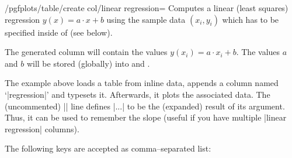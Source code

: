 \begin{stylekey}{/pgfplots/table/create col/linear regression=}%
	Computes a linear (least squares) regression $y(x) = a \cdot x + b$ using the sample data $(x_i,y_i)$ which has to be specified inside of  (see below).

	The generated column will contain the values $y(x_i) = a \cdot x_i + b$. The values $a$ and $b$ will be stored (globally) into \declareandlabel{\pgfplotstableregressiona} and \declareandlabel{\pgfplotstableregressionb}.

\begin{codeexample}[]
\loadedtbl

	{\loadedtbl}

\pgfplotstabletypeset\loadedtbl

\end{codeexample}

	\noindent The example above loads a table from inline data, appends a column named `|regression|' and typesets it. Afterwards, it plots the associated data. The (uncommented) |\xdef\slope{...}| line defines |\slope| to be the (expanded) result of its argument. Thus, it can be used to remember the slope (useful if you have multiple |linear regression| columns).

	The following  keys are accepted as comma--separated list:


\end{stylekey}
